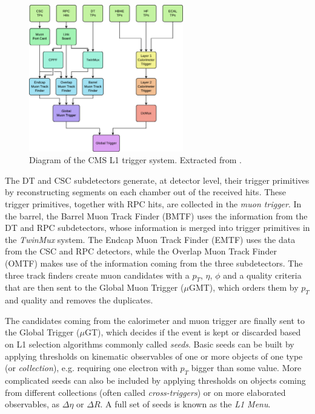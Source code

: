 \documentclass[../main.tex]{subfiles}
\begin{document}
 

\begin{figure}[h!]
\begin{center}
\includegraphics[width=0.6\textwidth]{Images/l1trigger}
\end{center}
\caption[CMS L1 trigger system]{Diagram of the CMS L1 trigger system. Extracted from \cite{intro:l1_13tev}.}
\label{intro:exp:l1trigger_sketch}
\end{figure}

The DT and CSC subdetectors generate, at detector level, their trigger primitives by reconstructing segments on each chamber out of the received hits. These trigger primitives, together with RPC hits, are collected in the \textit{muon trigger}. In the barrel, the Barrel Muon Track Finder (BMTF) uses the information from the DT and RPC subdetectors, whose information is merged into trigger primitives in the \textit{TwinMux} system. The Endcap Muon Track Finder (EMTF) uses the data from the CSC and RPC detectors, while the Overlap Muon Track Finder (OMTF) makes use of the information coming from the three subdetectors. The three track finders create muon candidates with a $p_T$, $\eta$, $\phi$ and a quality criteria that are then sent to the Global Muon Trigger ($\mu$GMT), which orders them by $p_T$ and quality and removes the duplicates.

The candidates coming from the calorimeter and muon trigger are finally sent to the Global Trigger ($\mu$GT), which decides if the event is kept or discarded based on L1 selection algorithms commonly called \textit{seeds}. Basic seeds can be built by applying thresholds on kinematic observables of one or more objects of one type (or \textit{collection}), e.g. requiring one electron with $p_T$ bigger than some value. More complicated seeds can also be included by applying thresholds on objects coming from different collections (often called \textit{cross-triggers}) or on more elaborated observables, as $\Delta\eta$ or $\Delta R$. A full set of seeds is known as the \textit{L1 Menu}.
\end{document}
